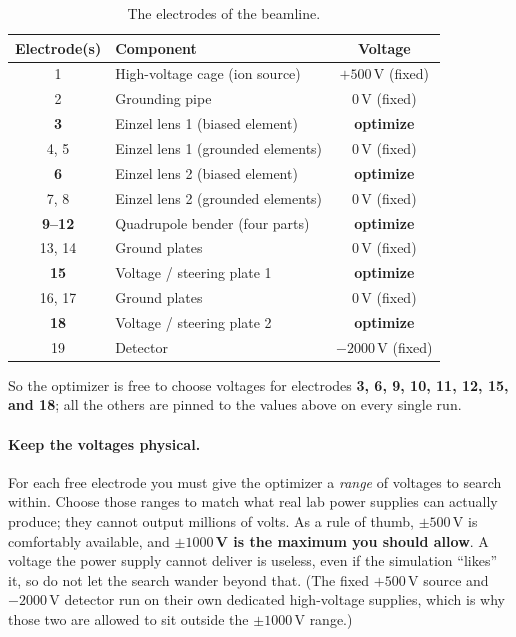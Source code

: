 \documentclass[11pt]{article}
\begin{document}
\begin{table}[h]
\centering
\caption{The electrodes of the beamline.}
\begin{tabular}{clc}
\toprule
\textbf{Electrode(s)} & \textbf{Component} & \textbf{Voltage} \\
\midrule
1        & High-voltage cage (ion source)        & $+500$\,V (fixed) \\
2        & Grounding pipe                        & $0$\,V (fixed) \\
\textbf{3}   & Einzel lens 1 (biased element)  & \textbf{optimize} \\
4, 5     & Einzel lens 1 (grounded elements)   & $0$\,V (fixed) \\
\textbf{6}   & Einzel lens 2 (biased element)  & \textbf{optimize} \\
7, 8     & Einzel lens 2 (grounded elements)   & $0$\,V (fixed) \\
\textbf{9--12} & Quadrupole bender (four parts)  & \textbf{optimize} \\
13, 14   & Ground plates                         & $0$\,V (fixed) \\
\textbf{15}  & Voltage / steering plate 1        & \textbf{optimize} \\
16, 17   & Ground plates                         & $0$\,V (fixed) \\
\textbf{18}  & Voltage / steering plate 2        & \textbf{optimize} \\
19       & Detector                              & $-2000$\,V (fixed) \\
\bottomrule
\end{tabular}
\end{table}

So the optimizer is free to choose voltages for electrodes
\textbf{3, 6, 9, 10, 11, 12, 15, and 18}; all the others are pinned to the
values above on every single run.

\paragraph{Keep the voltages physical.} For each free electrode you must give
the optimizer a \emph{range} of voltages to search within. Choose those ranges
to match what real lab power supplies can actually produce; they cannot
output millions of volts. As a rule of thumb, $\pm 500$\,V is comfortably
available, and \textbf{$\pm 1000$\,V is the maximum you should allow}. A voltage
the power supply cannot deliver is useless, even if the simulation ``likes''
it, so do not let the search wander beyond that. (The fixed $+500$\,V source and
$-2000$\,V detector run on their own dedicated high-voltage supplies, which is
why those two are allowed to sit outside the $\pm 1000$\,V range.)
\end{document}
